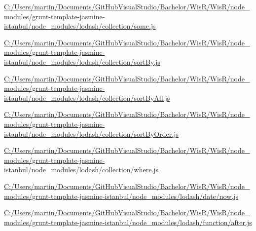 \begin{DoxyCompactItemize}
\item 
\hyperlink{_c_1_2_users_2martin_2_documents_2_git_hub_visual_studio_2_bachelor_2_wis_r_2_wis_r_2node_moduled56f6ad3fde7ce11d6547923518f4182}{C\+:/\+Users/martin/\+Documents/\+Git\+Hub\+Visual\+Studio/\+Bachelor/\+Wis\+R/\+Wis\+R/node\+\_\+modules/grunt-\/template-\/jasmine-\/istanbul/node\+\_\+modules/lodash/collection/some.\+js}
\item 
\hyperlink{_c_1_2_users_2martin_2_documents_2_git_hub_visual_studio_2_bachelor_2_wis_r_2_wis_r_2node_modulea0efb9e176d11e35081f3b4d0aa6596d}{C\+:/\+Users/martin/\+Documents/\+Git\+Hub\+Visual\+Studio/\+Bachelor/\+Wis\+R/\+Wis\+R/node\+\_\+modules/grunt-\/template-\/jasmine-\/istanbul/node\+\_\+modules/lodash/collection/sort\+By.\+js}
\item 
\hyperlink{_c_1_2_users_2martin_2_documents_2_git_hub_visual_studio_2_bachelor_2_wis_r_2_wis_r_2node_module60ff26414b8225853900c9c1fc31c101}{C\+:/\+Users/martin/\+Documents/\+Git\+Hub\+Visual\+Studio/\+Bachelor/\+Wis\+R/\+Wis\+R/node\+\_\+modules/grunt-\/template-\/jasmine-\/istanbul/node\+\_\+modules/lodash/collection/sort\+By\+All.\+js}
\item 
\hyperlink{_c_1_2_users_2martin_2_documents_2_git_hub_visual_studio_2_bachelor_2_wis_r_2_wis_r_2node_module73bd2870c7524a5f30a3608eae61e65d}{C\+:/\+Users/martin/\+Documents/\+Git\+Hub\+Visual\+Studio/\+Bachelor/\+Wis\+R/\+Wis\+R/node\+\_\+modules/grunt-\/template-\/jasmine-\/istanbul/node\+\_\+modules/lodash/collection/sort\+By\+Order.\+js}
\item 
\hyperlink{_c_1_2_users_2martin_2_documents_2_git_hub_visual_studio_2_bachelor_2_wis_r_2_wis_r_2node_moduleee5736b67f8fbe13950fbe49f80772c8}{C\+:/\+Users/martin/\+Documents/\+Git\+Hub\+Visual\+Studio/\+Bachelor/\+Wis\+R/\+Wis\+R/node\+\_\+modules/grunt-\/template-\/jasmine-\/istanbul/node\+\_\+modules/lodash/collection/where.\+js}
\item 
\hyperlink{_c_1_2_users_2martin_2_documents_2_git_hub_visual_studio_2_bachelor_2_wis_r_2_wis_r_2node_module14b0805c28cce7edfb50c37085f460e0}{C\+:/\+Users/martin/\+Documents/\+Git\+Hub\+Visual\+Studio/\+Bachelor/\+Wis\+R/\+Wis\+R/node\+\_\+modules/grunt-\/template-\/jasmine-\/istanbul/node\+\_\+modules/lodash/date/now.\+js}
\item 
\hyperlink{_c_1_2_users_2martin_2_documents_2_git_hub_visual_studio_2_bachelor_2_wis_r_2_wis_r_2node_modulea932b82425ee2bd3ff847f82cc61f43d}{C\+:/\+Users/martin/\+Documents/\+Git\+Hub\+Visual\+Studio/\+Bachelor/\+Wis\+R/\+Wis\+R/node\+\_\+modules/grunt-\/template-\/jasmine-\/istanbul/node\+\_\+modules/lodash/function/after.\+js}

\end{DoxyCompactItemize}
